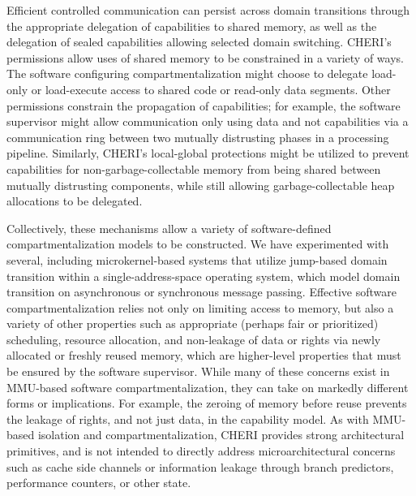 Efficient controlled communication can persist across domain transitions
through the appropriate delegation of capabilities to shared memory, as well
as the delegation of sealed capabilities allowing selected domain switching.
CHERI's permissions allow uses of shared memory to be constrained in a
variety of ways.
The software configuring compartmentalization might choose to delegate
load-only or load-execute access to shared code or read-only data segments.
Other permissions constrain the propagation of capabilities; for example, the
software supervisor might allow communication only using data and not
capabilities via a communication ring between two mutually distrusting phases
in a processing pipeline.
Similarly, CHERI's local-global protections might be utilized to prevent
capabilities for non-garbage-collectable memory from being shared between
mutually distrusting components, while still allowing garbage-collectable heap
allocations to be delegated.

Collectively, these mechanisms allow a variety of software-defined
compartmentalization models to be constructed.
We have experimented with several, including
microkernel-based systems that utilize jump-based domain transition within
a single-address-space operating system, which model domain transition on
asynchronous or synchronous message passing.
Effective software compartmentalization relies not only on limiting access to
memory, but also a variety of other properties such as appropriate (perhaps
fair or prioritized) scheduling, resource allocation, and non-leakage of data
or rights via newly allocated or freshly reused memory, which are higher-level
properties that must be ensured by the software supervisor.
While many of these concerns exist in MMU-based software compartmentalization,
they can take on markedly different forms or implications.
For example, the zeroing of memory before reuse prevents the leakage of
rights, and not just data, in the capability model.
As with MMU-based isolation and compartmentalization, CHERI provides strong
architectural primitives, and is not intended to directly address
microarchitectural concerns such as cache side channels or information leakage
through branch predictors, performance counters, or other state.


